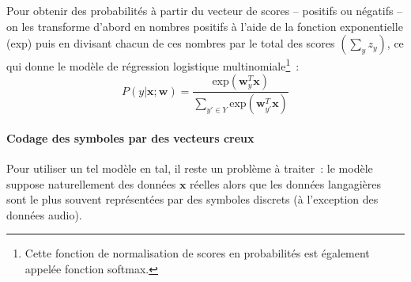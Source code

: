 \documentclass[11pt,openany]{book}
\newcommand{\ac}[1]{{\sc #1}} %
\begin{document}
Pour obtenir des probabilités à partir du vecteur de scores --
positifs ou négatifs --  on les transforme d'abord en nombres positifs à l'aide de la
fonction exponentielle (exp) puis en divisant chacun de ces nombres
par le total des scores $(\sum_y z_y )$, ce qui donne le modèle de
régression logistique multinomiale\footnote{Cette fonction de
  normalisation de scores en probabilités est également appelée fonction softmax.}~:
\begin{equation}
\label{eq-multinomial-logistic-numeric}
P(y|\mathbf{x};\mathbf{w}) =  \frac{\text{exp}(\mathbf{w}_y^T
    \mathbf{x}) }{\sum_{y'\in Y} \text{exp}(\mathbf{w}_{y'}^T
    \mathbf{x})}
\end{equation}
\paragraph{Codage des symboles par des vecteurs creux}
Pour utiliser un tel modèle
en \ac{tal}, il reste un problème à
traiter~: le modèle suppose naturellement des données $\mathbf{x}$ réelles alors
que les données langagières sont le plus souvent représentées par des
symboles discrets (à l'exception des données audio).
\end{document}
